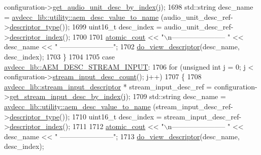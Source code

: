 \begin{DoxyCode}
      configuration->\hyperlink{classavdecc__lib_1_1configuration__descriptor_aa723a66eba00ad8c8f5361951f5af6e7}{get\_audio\_unit\_desc\_by\_index}(j);
1698             std::string desc\_name = \hyperlink{namespaceavdecc__lib_1_1utility_a6bdd02679e5a911a071d4aa03be341f0}{avdecc\_lib::utility::aem\_desc\_value\_to\_name}
      (audio\_unit\_desc\_ref->\hyperlink{classavdecc__lib_1_1descriptor__base_a5112b70022171063ec5d3242bee9910e}{descriptor\_type}());
1699             uint16\_t desc\_index = audio\_unit\_desc\_ref->\hyperlink{classavdecc__lib_1_1descriptor__base_a7eed5583bffdf72d89021b188648c1b5}{descriptor\_index}();
1700 
1701             \hyperlink{cmd__line_8h_a0bc38ccc65c79ba06c6fcd7b4bf554c3}{atomic\_cout} << \textcolor{stringliteral}{"\(\backslash\)n----------------------- "} << desc\_name << \textcolor{stringliteral}{"
       -----------------------"};
1702             \hyperlink{classcmd__line_aef7d9f8c4eff85c46e5b7aea0961bb51}{do\_view\_descriptor}(desc\_name, desc\_index);
1703         \}
1704 
1705     \textcolor{keywordflow}{case} \hyperlink{namespaceavdecc__lib_ac7b7d227e46bc72b63ee9e9aae15902fa00d002e47651a1b007d50f9f2da51e53}{avdecc\_lib::AEM\_DESC\_STREAM\_INPUT}:
1706         \textcolor{keywordflow}{for} (\textcolor{keywordtype}{unsigned} \textcolor{keywordtype}{int} j = 0; j < configuration->\hyperlink{classavdecc__lib_1_1configuration__descriptor_ab7ef88f0a1d5d8c27f0c4c6687f6a98e}{stream\_input\_desc\_count}(); j++)
1707         \{
1708             \hyperlink{classavdecc__lib_1_1stream__input__descriptor}{avdecc\_lib::stream\_input\_descriptor} * stream\_input\_desc\_ref 
      = configuration->\hyperlink{classavdecc__lib_1_1configuration__descriptor_a69cfe9032cea21937b4153878f8a925c}{get\_stream\_input\_desc\_by\_index}(j);
1709             std::string desc\_name = \hyperlink{namespaceavdecc__lib_1_1utility_a6bdd02679e5a911a071d4aa03be341f0}{avdecc\_lib::utility::aem\_desc\_value\_to\_name}
      (stream\_input\_desc\_ref->\hyperlink{classavdecc__lib_1_1descriptor__base_a5112b70022171063ec5d3242bee9910e}{descriptor\_type}());
1710             uint16\_t desc\_index = stream\_input\_desc\_ref->\hyperlink{classavdecc__lib_1_1descriptor__base_a7eed5583bffdf72d89021b188648c1b5}{descriptor\_index}();
1711 
1712             \hyperlink{cmd__line_8h_a0bc38ccc65c79ba06c6fcd7b4bf554c3}{atomic\_cout} << \textcolor{stringliteral}{"\(\backslash\)n----------------------- "} << desc\_name << \textcolor{stringliteral}{"
       -----------------------"};
1713             \hyperlink{classcmd__line_aef7d9f8c4eff85c46e5b7aea0961bb51}{do\_view\_descriptor}(desc\_name, desc\_index);

\end{DoxyCode}
